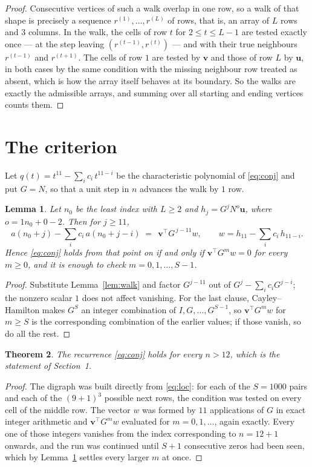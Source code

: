 \documentclass[11pt,a4paper]{article}
\theoremstyle{plain}
\newtheorem{theorem}{Theorem}
\newtheorem{lemma}[theorem]{Lemma}
\theoremstyle{definition}
\begin{document}
\begin{proof}
Consecutive vertices of such a walk overlap in one row, so a walk of that shape is
precisely a sequence $r^{(1)},\dots,r^{(L)}$ of rows, that is, an array of $L$ rows
and $3$ columns. In the walk, the cells of row $t$ for $2\le t\le L-1$ are tested
exactly once --- at the step leaving $(r^{(t-1)},r^{(t)})$ --- and with their true
neighbours $r^{(t-1)}$ and $r^{(t+1)}$. The cells of row $1$ are tested by
$\mathbf{v}$ and those of row $L$ by $\mathbf{u}$, in both cases by the same condition
with the missing neighbour row treated as absent, which is how the array itself behaves at
its boundary. So the walks are exactly the admissible arrays, and summing over all starting
and ending vertices counts them.
\end{proof}

\section{The criterion}

Let $q(t)=t^{11}-\sum_i c_i\,t^{11-i}$ be the characteristic polynomial of
\eqref{eq:conj} and put $G=N$, so that a unit step in $n$ advances the walk by
$1$ row.

\begin{lemma}\label{lem:crit}
Let $n_0$ be the least index with $L\ge2$ and $h_j=G^{j}N^{o}\mathbf{u}$, where
$o=1n_0+0-2$. Then for $j\ge11$,
\[
a(n_0+j)-\sum_i c_i\,a(n_0+j-i)\;=\;\,\mathbf{v}^{\!\top}G^{\,j-11}w,
\qquad w=h_{11}-\sum_i c_i\,h_{11-i} .
\]
Hence \eqref{eq:conj} holds from that point on if and only if
$\mathbf{v}^{\!\top}G^{m}w=0$ for every $m\ge0$, and it is enough to check
$m=0,1,\dots,S-1$.
\end{lemma}

\begin{proof}
Substitute Lemma~\ref{lem:walk} and factor $G^{j-11}$ out of
$G^{j}-\sum_ic_iG^{j-i}$; the nonzero scalar $1$ does not affect
vanishing. For the last clause, Cayley--Hamilton makes $G^{S}$ an integer combination of
$I,G,\dots,G^{S-1}$, so $\mathbf{v}^{\!\top}G^{m}w$ for $m\ge S$ is the corresponding
combination of the earlier values; if those vanish, so do all the rest.
\end{proof}

\begin{theorem}
The recurrence \eqref{eq:conj} holds for every $n>12$, which is the statement of
Section~1.
\end{theorem}

\begin{proof}
The digraph was built directly from \eqref{eq:loc}: for each of the $S=1000$ pairs and each
of the $(9+1)^{3}$ possible next rows, the condition was tested on every cell of
the middle row. The vector $w$ was formed by $11$ applications of $G$ in exact integer
arithmetic and $\mathbf{v}^{\!\top}G^{m}w$ evaluated for $m=0,1,\dots$, again exactly.
Every one of those integers vanishes from the index corresponding to $n=12+1$ onwards,
and the run was continued until $S+1$ consecutive zeros had been seen, which by
Lemma~\ref{lem:crit} settles every larger $m$ at once.
\end{proof}
\end{document}
